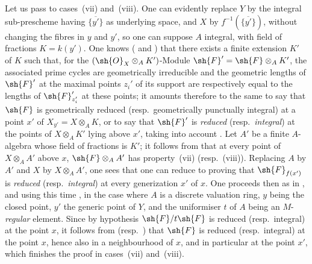 \begin{env}[12.1.1.3]
\label{IV.12.1.1.3}
Let us pass to cases~(vii) and~(viii).
One can evidently replace $Y$ by the integral sub-prescheme having $\overline{\{y'\}}$ as underlying space, and $X$ by $f^{-1}(\overline{\{y'\}})$, without changing the fibres in $y$ and $y'$, so one can suppose $A$ integral, with field of fractions $K=k(y')$.
One knows ( and ) that there exists a finite extension $K'$ of $K$ such that, for the $(\sh{O}_X\otimes_A K')$-Module $\sh{F}'=\sh{F}\otimes_A K'$, the associated prime cycles are geometrically irreducible and the geometric lengths of $\sh{F}'$ at the maximal points $z_i'$ of its support are respectively equal to the lengths of $\sh{F}'_{z_i'}$ at these points; it amounts therefore to the same to say that $\sh{F}$ is geometrically reduced (resp.\ geometrically punctually integral) at a point $x'$ of $X_{y'}=X\otimes_A K$, or to say that $\sh{F}'$ is \emph{reduced} (resp.\ \emph{integral}) at the points of $X\otimes_A K'$ lying above $x'$, taking into account .
Let $A'$ be a finite $A$-algebra whose field of fractions is $K'$; it follows from  that at every point of $X\otimes_A A'$ above $x$, $\sh{F}\otimes_A A'$ has property~(vii) (resp.~(viii)).
Replacing $A$ by $A'$ and $X$ by $X\otimes_A A'$, one sees that one can reduce to proving that $\sh{F}_{f(x')}$ is \emph{reduced} (resp.\ \emph{integral}) at every generization $x'$ of $x$.
One proceeds then as in , and using this time , in the case where $A$ is a discrete valuation ring, $y$ being the closed point, $y'$ the generic point of $Y$, and the uniformiser $t$ of $A$ being an $M$-\emph{regular} element.
Since by hypothesis $\sh{F}/t\sh{F}$ is reduced (resp.\ integral) at the point $x$, it follows from  (resp.\ ) that $\sh{F}$ is reduced (resp.\ integral) at the point $x$, hence also in a neighbourhood of $x$, and in particular at the point $x'$, which finishes the proof in cases~(vii) and~(viii).
\end{env}

